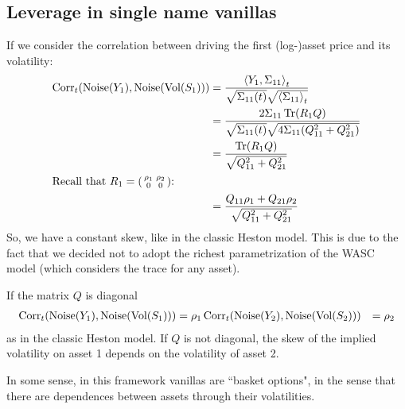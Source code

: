 \subsection{Leverage in single name vanillas}
If we consider the correlation between driving the first (log-)asset price and its volatility:
\begin{align}
    \corr_t(\text{Noise}(Y_1),\text{Noise}(\text{Vol}(S_1))) &= \frac{\expval{Y_1,\Sigma_{11}}_t}{\sqrt{\Sigma_{11}(t)}\sqrt{\expval{\Sigma_{11}}_t}} \\
    &=
    \frac{2\Sigma_{11}\Tr(R_1Q)}{\sqrt{\Sigma_{11}(t)}\sqrt{4\Sigma_{11}(Q_{11}^2+Q_{21}^2)}} \\
    &=
    \frac{\Tr(R_1Q)}{\sqrt{Q_{11}^2+Q_{21}^2}} \\
    \intertext{Recall that $R_1 = \smqty(\rho_1 & \rho_2 \\ 0 & 0)$:}
    &=
    \frac{Q_{11}\rho_1+Q_{21}\rho_2}{\sqrt{Q_{11}^2+Q_{21}^2}}
\end{align}
So, we have a constant skew, like in the classic Heston model. This is due to the fact that we decided not to adopt the richest parametrization of the WASC model (which considers the trace for any asset).
\begin{remark}
    If the matrix $Q$ is diagonal
    \begin{align*}
        \operatorname{Corr}_t(\text{Noise}(Y_1),\text{Noise}(\text{Vol}(S_1))) &= \rho_1
        \operatorname{Corr}_t(\text{Noise}(Y_2),\text{Noise}(\text{Vol}(S_2))) &= \rho_2
    \end{align*}
    as in the classic Heston model. If $Q$ is not diagonal, the skew of the implied volatility on asset 1 depends on the volatility of asset 2.
\end{remark}
In some sense, in this framework vanillas are ``basket options", in the sense that there are dependences between assets through their volatilities.

